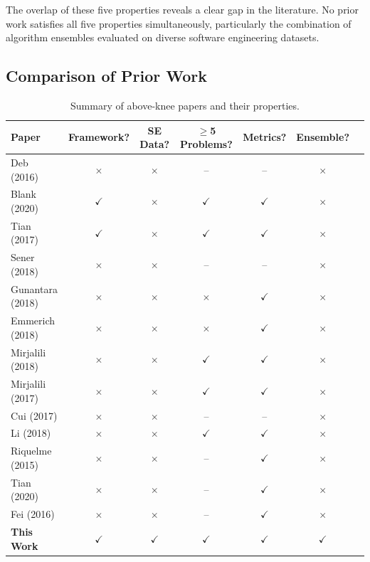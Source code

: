 \documentclass[sigconf,authorversion,nonacm]{acmart}
\begin{document}
The overlap of these five properties reveals a clear gap in the literature. 
No prior work satisfies all five properties simultaneously, particularly 
the combination of algorithm ensembles evaluated on diverse software 
engineering datasets.

\subsection{Comparison of Prior Work}

\begin{table}[h]
\centering
\caption{Summary of above-knee papers and their properties.}
\begin{tabular}{lcccccc}
\hline
Paper & Framework? & SE Data? & $\geq$5 Problems? & Metrics? & Ensemble? \\
\hline
Deb (2016) & $\times$ & $\times$ & -- & -- & $\times$ \\
Blank (2020) & $\checkmark$ & $\times$ & $\checkmark$ & $\checkmark$ & $\times$ \\
Tian (2017) & $\checkmark$ & $\times$ & $\checkmark$ & $\checkmark$ & $\times$ \\
Sener (2018) & $\times$ & $\times$ & -- & -- & $\times$ \\
Gunantara (2018) & $\times$ & $\times$ & $\times$ & $\checkmark$ & $\times$ \\
Emmerich (2018) & $\times$ & $\times$ & $\times$ & $\checkmark$ & $\times$ \\
Mirjalili (2018) & $\times$ & $\times$ & $\checkmark$ & $\checkmark$ & $\times$ \\
Mirjalili (2017) & $\times$ & $\times$ & $\checkmark$ & $\checkmark$ & $\times$ \\
Cui (2017) & $\times$ & $\times$ & -- & -- & $\times$ \\
Li (2018) & $\times$ & $\times$ & $\checkmark$ & $\checkmark$ & $\times$ \\
Riquelme (2015) & $\times$ & $\times$ & -- & $\checkmark$ & $\times$ \\
Tian (2020) & $\times$ & $\times$ & -- & $\checkmark$ & $\times$ \\
Fei (2016) & $\times$ & $\times$ & -- & $\checkmark$ & $\times$ \\
\textbf{This Work} & $\checkmark$ & $\checkmark$ & $\checkmark$ & $\checkmark$ & $\checkmark$ \\
\hline
\end{tabular}
\end{table}
\end{document}
